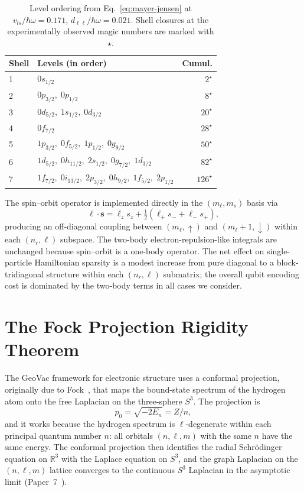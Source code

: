 \documentclass[twocolumn,prc,amsmath,amssymb,superscriptaddress]{revtex4-2}
\begin{document}
\begin{table}[t]
  \centering
  \caption{Level ordering from Eq.~\eqref{eq:mayer-jensen} at
    $v_{ls}/\hbar\omega = 0.171$, $d_{\ell\ell}/\hbar\omega = 0.021$.
    Shell closures at the experimentally observed magic numbers are
    marked with $\star$.}
  \label{tab:levels}
  \begin{ruledtabular}
  \begin{tabular}{llr}
    Shell & Levels (in order) & Cumul. \\
    \hline
    1 & $0s_{1/2}$ & $2^\star$ \\
    2 & $0p_{3/2},\;0p_{1/2}$ & $8^\star$ \\
    3 & $0d_{5/2},\;1s_{1/2},\;0d_{3/2}$ & $20^\star$ \\
    4 & $0f_{7/2}$ & $28^\star$ \\
    5 & $1p_{3/2},\;0f_{5/2},\;1p_{1/2},\;0g_{9/2}$ & $50^\star$ \\
    6 & $1d_{5/2},\;0h_{11/2},\;2s_{1/2},\;0g_{7/2},\;1d_{3/2}$ & $82^\star$ \\
    7 & $1f_{7/2},\;0i_{13/2},\;2p_{3/2},\;0h_{9/2},\;1f_{5/2},\;2p_{1/2}$
      & $126^\star$ \\
  \end{tabular}
  \end{ruledtabular}
\end{table}

The spin--orbit operator is implemented directly in the
$(m_\ell, m_s)$ basis via
\[
  \boldsymbol{\ell}\cdot\mathbf{s} = \ell_z s_z
  + \tfrac{1}{2}(\ell_+ s_- + \ell_- s_+),
\]
producing an off-diagonal coupling between $(m_\ell, {\uparrow})$ and
$(m_\ell + 1, {\downarrow})$ within each $(n_r, \ell)$ subspace. The
two-body electron-repulsion-like integrals are unchanged because
spin--orbit is a one-body operator. The net effect on single-particle
Hamiltonian sparsity is a modest increase from pure diagonal to a
block-tridiagonal structure within each $(n_r, \ell)$ submatrix; the
overall qubit encoding cost is dominated by the two-body terms in all
cases we consider.

\section{The Fock Projection Rigidity Theorem}
\label{sec:rigidity}

The GeoVac framework for electronic structure uses a conformal
projection, originally due to Fock~\cite{Fock1935}, that maps the
bound-state spectrum of the hydrogen atom onto the free Laplacian on
the three-sphere $S^3$. The projection is
\[
  p_0 = \sqrt{-2 E_n} = Z/n ,
\]
and it works because the hydrogen spectrum is $\ell$-degenerate within
each principal quantum number $n$: all orbitals $(n,\ell,m)$ with the
same $n$ have the same energy. The conformal projection then identifies
the radial Schr\"odinger equation on $\mathbb{R}^3$ with the Laplace
equation on $S^3$, and the graph Laplacian on the $(n,\ell,m)$ lattice
converges to the continuous $S^3$ Laplacian in the asymptotic limit
(Paper~7~\cite{Paper7}).
\end{document}
